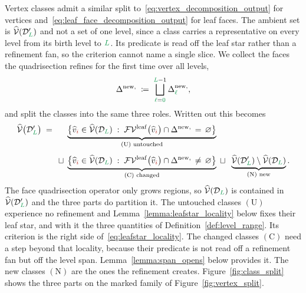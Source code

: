 \documentclass[a4paper, 12pt]{article}
\makeatletter
\newcommand{\green}{\color{ForestGreen}}
\newcommand{\brickred}{\color{BrickRed}}
\newcommand{\V}{\mathcal{V}}
\newcommand{\F}{\mathcal{F}}
\DeclareRobustCommand{\simplexsubsetNew}[2][]{\Delta^{\mathrm{new}\ifx\@empty#1\@empty\else,#1\fi}_{#2}}
\DeclareRobustCommand{\simplexsubsetNewAll}[1][]{\Delta^{\mathrm{new}\ifx\@empty#1\@empty\else,#1\fi}}
\newcommand{\vertexClass}[1]{\widehat{v}_{#1}}
\newcommand{\vertexClasses}{\widehat{\V}}
\newcommand{\coarseIdxone}{{\brickred i}}
\renewcommand{\l}{{\green\ell}}
\renewcommand{\L}{{\green L}}
\newcommand{\lzero}{{\green 0}}
\theoremstyle{definition}
\theoremstyle{plain}
\numberwithin{equation}{section}
\DeclareRobustCommand{\domseq}[1][]{\mathcal{D}\ifx\@empty#1\@empty\else_{#1}\fi}
\newcommand{\FVleaf}[1]{\F\V^{\mathrm{leaf}}_{#1}}          %
\makeatother
\begin{document}
Vertex classes admit a similar split to~\eqref{eq:vertex_decomposition_output} for vertices and~\eqref{eq:leaf_face_decomposition_output} for leaf faces. The ambient set is $\vertexClasses(\domseq[\L]')$ and not a set of one level, since a class carries a representative on every level from its birth level to $\L$. Its predicate is read off the leaf star rather than a refinement fan, so the criterion cannot name a single slice. We collect the faces the quadrisection refines for the first time over all levels,
\begin{equation}
    \label{eq:newly_refined_family}
    \simplexsubsetNewAll{} \; \coloneq \; \bigsqcup\limits_{\l = \lzero}^{\L-1} \simplexsubsetNew{\l} ,
\end{equation}
and split the classes into the same three roles. Written out this becomes
\begin{equation}
    \label{eq:vertex_class_decomposition_output}
    \begin{split}
        \vertexClasses \big( \domseq[\L]' \big) \; = \;\;\;\;\;\; & \underbrace{\big\{ \vertexClass{\coarseIdxone} \in \vertexClasses(\domseq[\L]) \; : \; \FVleaf{} \big( \vertexClass{\coarseIdxone} \big) \cap \simplexsubsetNewAll{} \, = \, \varnothing \big\}}_{(\mathrm{U}) \text{ untouched}} \\[4pt]
        \sqcup \; & \underbrace{\big\{ \vertexClass{\coarseIdxone} \in \vertexClasses(\domseq[\L]) \; : \; \FVleaf{} \big( \vertexClass{\coarseIdxone} \big) \cap \simplexsubsetNewAll{} \, \neq \, \varnothing \big\}}_{(\mathrm{C}) \text{ changed}} \; \sqcup \;\; \underbrace{\vertexClasses(\domseq[\L]') \setminus \vertexClasses(\domseq[\L])}_{(\mathrm{N}) \text{ new}} .
    \end{split}
\end{equation}
The face quadrisection operator only grows regions, so $\vertexClasses(\domseq[\L])$ is contained in $\vertexClasses(\domseq[\L]')$ and the three parts do partition it. The untouched classes $(\mathrm{U})$ experience no refinement and Lemma~\ref{lemma:leafstar_locality} below fixes their leaf star, and with it the three quantities of Definition~\ref{def:level_range}. Its criterion is the right side of~\eqref{eq:leafstar_locality}. The changed classes $(\mathrm{C})$ need a step beyond that locality, because their predicate is not read off a refinement fan but off the level span. Lemma~\ref{lemma:span_opens} below provides it. The new classes $(\mathrm{N})$ are the ones the refinement creates. Figure~\ref{fig:class_split} shows the three parts on the marked family of Figure~\ref{fig:vertex_split}.
\end{document}
